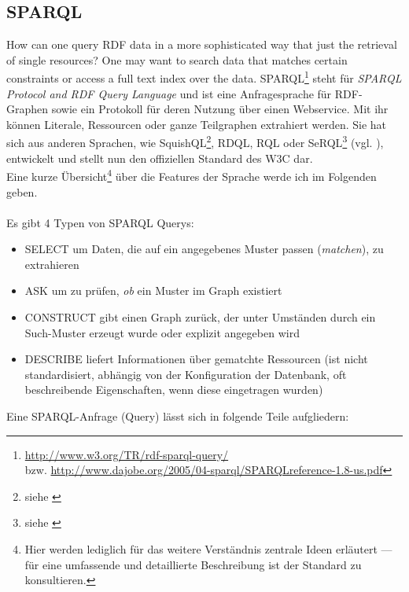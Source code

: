 \subsection{SPARQL} \label{sec:sparql}
How can one query RDF data in a more sophisticated way that just the retrieval of single resources? One may want to search data that matches certain constraints or access a full text index over the data.
SPARQL\footnote{\url{http://www.w3.org/TR/rdf-sparql-query/} \\
bzw. \url{http://www.dajobe.org/2005/04-sparql/SPARQLreference-1.8-us.pdf}} steht für \emph{SPARQL Protocol and RDF Query Language} und ist eine Anfragesprache für RDF-Graphen sowie ein Protokoll für deren Nutzung über einen Webservice. Mit ihr können Literale, Ressourcen oder ganze Teilgraphen extrahiert werden. Sie hat sich aus anderen Sprachen, wie SquishQL\footnote{siehe \cite{squishQL}}, RDQL, RQL oder SeRQL\footnote{siehe \cite{serql}} (vgl. \cite{compQL}), entwickelt und stellt nun den offiziellen Standard des W3C dar.\\
Eine kurze Übersicht\footnote{Hier werden lediglich für das weitere Verständnis zentrale Ideen erläutert --- für eine umfassende und detaillierte Beschreibung ist der Standard zu konsultieren.} über die Features der Sprache werde ich im Folgenden geben.\\
\vspace{0.1cm}\\
Es gibt 4 Typen von SPARQL Querys:
\begin{itemize}
	\item{SELECT um Daten, die auf ein angegebenes Muster passen (\emph{matchen}), zu extrahieren}
	\item{ASK um zu prüfen, \emph{ob} ein Muster im Graph existiert}
	\item{CONSTRUCT gibt einen Graph zurück, der unter Umständen durch ein Such-Muster erzeugt wurde oder explizit angegeben wird}
	\item{DESCRIBE liefert Informationen über gematchte Ressourcen (ist nicht standardisiert, abhängig von der Konfiguration der Datenbank, oft beschreibende Eigenschaften, wenn diese eingetragen wurden)}
\end{itemize}
Eine SPARQL-Anfrage (Query) lässt sich in folgende Teile aufgliedern:

